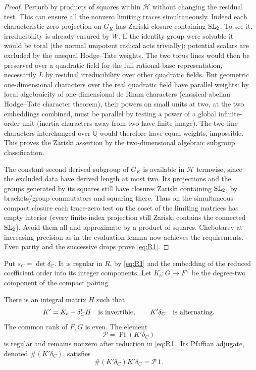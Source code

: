 \begin{proof}
Perturb by products of squares within \(\mathcal H\) without changing the residual test. This can ensure all the nonzero limiting traces simultaneously. Indeed each characteristic-zero projection on \(G_K\) has Zariski closure containing \({\rm SL}_2\). To see it, irreducibility is already ensured by \(W\). If the identity group were solvable it would be toral (the normal unipotent radical acts trivially); potential scalars are excluded by the unequal Hodge--Tate weights. The two torus lines would then be preserved over a quadratic field for the full rational-base representation, necessarily \(L\) by residual irreducibility over other quadratic fields. But geometric one-dimensional characters over the real quadratic field have parallel weights: by local algebraicity of one-dimensional de Rham characters (classical abelian Hodge--Tate character theorem), their powers on small units at two, at the two embeddings combined, must be parallel by testing a power of a global infinite-order unit (inertia characters away from two have finite image). The two line characters interchanged over \(\mathbb Q\) would therefore have equal weights, impossible. This proves the Zariski assertion by the two-dimensional algebraic subgroup classification.

The constant second derived subgroup of \(G_K\) is available in \(\mathcal H\) termwise, since the excluded data have derived length at most two. Its projections and the groups generated by its squares still have closures Zariski containing \({\rm SL}_2\), by brackets/group commutators and squaring there. Thus on the simultaneous compact closure each trace-zero test on the coset of the limiting matrices has empty interior (every finite-index projection still Zariski contains the connected \({\rm SL}_2\)). Avoid them all and approximate by a product of squares. Chebotarev at increasing precision as in the evaluation lemma now achieves the requirements. Even parity and the successive drops prove \eqref{eq:R1}.
\end{proof}

Put \(s_C=\det\delta_C\). It is regular in \(R\), by
\eqref{eq:R1} and the embedding of the reduced coefficient order into
its integer components. Let \(K_b:G\to F^\vee\) be the degree-two
component of the compact pairing.

\begin{lemma}\label{real:pfaffian}
There is an integral matrix \(H\) such that
\begin{equation}\label{real:alternating-presentation}
 K'=K_b+\delta_C^tH\quad\hbox{is invertible},
 \qquad K'\delta_C\quad\hbox{is alternating}.
\end{equation}
The common rank of \(F,G\) is even. The element
\[
 \mathcal P=\operatorname{Pf}(K'\delta_C)
\]
is regular and remains nonzero after reduction in \eqref{eq:R1}.
Its Pfaffian adjugate, denoted \(\#(K'\delta_C)\), satisfies
\[
 \#(K'\delta_C)K'\delta_C=\mathcal P\,1.
\]
\end{lemma}

